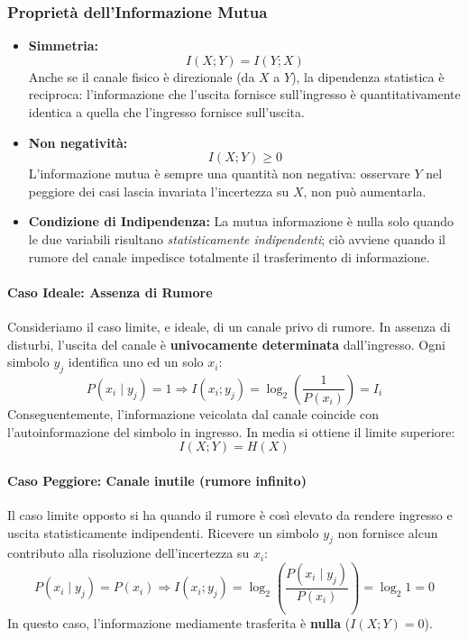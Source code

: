 \subsubsection{Proprietà dell'Informazione Mutua}
\begin{itemize}
    \item \textbf{Simmetria:}
        \[ I(X;Y) = I(Y;X) \]
        Anche se il canale fisico è direzionale (da $X$ a $Y$), la dipendenza statistica è reciproca: l'informazione che l'uscita fornisce sull'ingresso è quantitativamente identica a quella che l'ingresso fornisce sull'uscita.

    \item \textbf{Non negatività:}
        \[ I(X;Y) \geq 0 \]
        L'informazione mutua è sempre una quantità non negativa: osservare $Y$ nel peggiore dei casi lascia invariata l'incertezza su $X$, non può aumentarla.
    
    \item \textbf{Condizione di Indipendenza:}   
        La mutua informazione è nulla solo quando le due variabili risultano \textit{statisticamente indipendenti}; ciò avviene quando il rumore del canale impedisce totalmente il trasferimento di informazione.
\end{itemize}

\paragraph{Caso Ideale: Assenza di Rumore}
Consideriamo il caso limite, e ideale, di un canale privo di rumore. In assenza di disturbi, l'uscita del canale è \textbf{univocamente determinata} dall'ingresso. Ogni simbolo $y_j$ identifica uno ed un solo $x_i$:
\[ P(x_i \mid y_j) = 1 \Rightarrow I(x_i;y_j) = \log_2 \left( \frac{1}{P(x_i)}\right) = I_i \]
Conseguentemente, l'informazione veicolata dal canale coincide con l'autoinformazione del simbolo in ingresso. In media si ottiene il limite superiore:
\[I(X;Y)= H(X)\]

\paragraph{Caso Peggiore: Canale inutile (rumore infinito)}
Il caso limite opposto si ha quando il rumore è così elevato da rendere ingresso e uscita statisticamente indipendenti. Ricevere un simbolo $y_j$ non fornisce alcun contributo alla risoluzione dell'incertezza su $x_i$:
\[P(x_i \mid y_j) = P(x_i) \Rightarrow I(x_i;y_j) = \log_2 \left( \frac{P(x_i \mid y_j)}{P(x_i)} \right) = \log_2 1 = 0 \]
In questo caso, l'informazione mediamente trasferita è \textbf{nulla} ($I(X;Y) = 0$).

